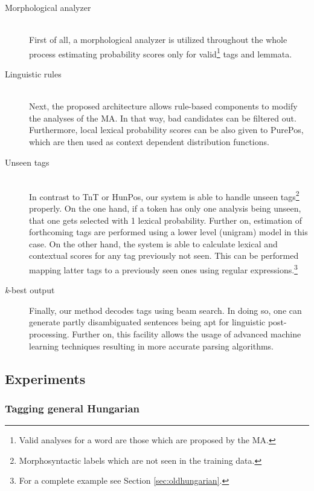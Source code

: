 \begin{description}
  \item[Morphological analyzer] \hfill \\
  First of all, a morphological analyzer is utilized throughout the whole process estimating probability scores only for valid\footnote{Valid analyses for a word are those which are proposed by the MA.} tags and lemmata.
  \item[Linguistic rules] \hfill \\
  Next, the proposed architecture allows rule-based components to modify the analyses of the MA. In that way, bad candidates can be filtered out. Furthermore, local lexical probability scores can be also given to PurePos, which are then used as context dependent distribution functions. 
  \item[Unseen tags] \hfill \\ 
  In contrast to TnT or HunPos, our system is able to handle unseen tags\footnote{Morphosyntactic labels which are not seen in the training data.} properly. On the one hand, if a token has only one analysis being unseen, that one gets selected with 1 lexical probability. Further on, estimation of forthcoming tags are performed using a lower level (unigram) model in this case. On the other hand, the system is able to calculate lexical and contextual scores for any tag previously not seen. This can be performed mapping latter tags to a previously seen ones using regular expressions.\footnote{For a complete example see Section \ref{sec:oldhungarian}.}
  \item[\emph{k}-best output] Finally, our method decodes tags using beam search. In doing so, one can generate partly disambiguated sentences being apt for linguistic post-processing. Further on, this facility allows the usage of advanced machine learning techniques resulting in more accurate parsing algorithms.
\end{description}


\subsection{Experiments}


\subsubsection{Tagging general Hungarian}

